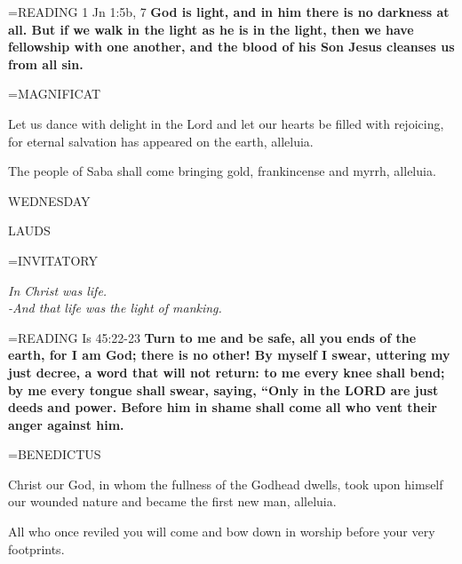 \hangindent=\parindent \small{READING}    1 Jn 1:5b, 7 \textbf{   God is light, and in him there is no darkness at all. But if we walk in the light as he is in the light, then we have fellowship with one another, and the blood of his Son Jesus cleanses us from all sin.\\}

\hangindent=\parindent \small MAGNIFICAT
\begin{description}[labelindent=\parindent, noitemsep, leftmargin=*]
\item [(before the Epiphany):]  Let us dance with delight in the Lord and let our hearts be filled with rejoicing, for eternal salvation has appeared on the earth, alleluia.
\item [(Thursday after the Epiphany):]  The people of Saba shall come bringing gold, frankincense and myrrh, alleluia.
\end{description}

\begin{center}
\normalsize WEDNESDAY
\end{center}

\begin{flushleft}\normalsize LAUDS\\\end{flushleft}

\hangindent=\parindent \small{INVITATORY}
\begin{center}
\textit{In Christ was life.\\}
\textit{-And that life was the light of manking.\\}
\end{center}

\hangindent=\parindent \small{READING}    Is 45:22-23 \textbf{   Turn to me and be safe, all you ends of the earth, for I am God; there is no other! By myself I swear, uttering my just decree, a word that will not return: to me every knee shall bend; by me every tongue shall swear, saying, “Only in the LORD are just deeds and power. Before him in shame shall come all who vent their anger against him.\\}

\hangindent=\parindent \small BENEDICTUS
\begin{description}[labelindent=\parindent, noitemsep, leftmargin=*]
\item [(before the Epiphany):]  Christ our God, in whom the fullness of the Godhead dwells, took upon himself our wounded nature and became the first new man, alleluia.
\item [(Friday after the Epiphany):]  All who once reviled you will come and bow down in worship before your very footprints.
\end{description}


